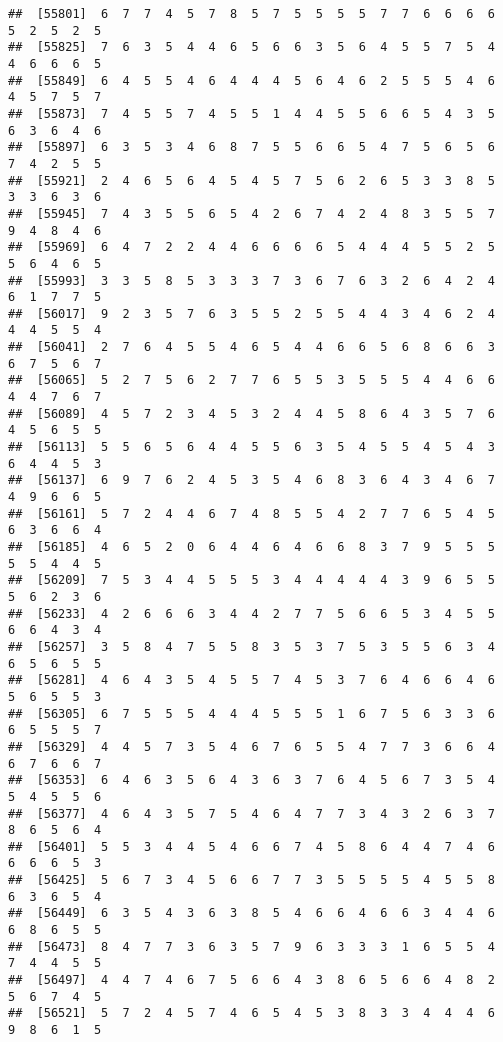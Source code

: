 \documentclass[
]{book}
\begin{document}
\begin{verbatim}
##  [55801]  6  7  7  4  5  7  8  5  7  5  5  5  5  7  7  6  6  6  6  5  2  5  2  5
##  [55825]  7  6  3  5  4  4  6  5  6  6  3  5  6  4  5  5  7  5  4  4  6  6  6  5
##  [55849]  6  4  5  5  4  6  4  4  4  5  6  4  6  2  5  5  5  4  6  4  5  7  5  7
##  [55873]  7  4  5  5  7  4  5  5  1  4  4  5  5  6  6  5  4  3  5  6  3  6  4  6
##  [55897]  6  3  5  3  4  6  8  7  5  5  6  6  5  4  7  5  6  5  6  7  4  2  5  5
##  [55921]  2  4  6  5  6  4  5  4  5  7  5  6  2  6  5  3  3  8  5  3  3  6  3  6
##  [55945]  7  4  3  5  5  6  5  4  2  6  7  4  2  4  8  3  5  5  7  9  4  8  4  6
##  [55969]  6  4  7  2  2  4  4  6  6  6  6  5  4  4  4  5  5  2  5  5  6  4  6  5
##  [55993]  3  3  5  8  5  3  3  3  7  3  6  7  6  3  2  6  4  2  4  6  1  7  7  5
##  [56017]  9  2  3  5  7  6  3  5  5  2  5  5  4  4  3  4  6  2  4  4  4  5  5  4
##  [56041]  2  7  6  4  5  5  4  6  5  4  4  6  6  5  6  8  6  6  3  6  7  5  6  7
##  [56065]  5  2  7  5  6  2  7  7  6  5  5  3  5  5  5  4  4  6  6  4  4  7  6  7
##  [56089]  4  5  7  2  3  4  5  3  2  4  4  5  8  6  4  3  5  7  6  4  5  6  5  5
##  [56113]  5  5  6  5  6  4  4  5  5  6  3  5  4  5  5  4  5  4  3  6  4  4  5  3
##  [56137]  6  9  7  6  2  4  5  3  5  4  6  8  3  6  4  3  4  6  7  4  9  6  6  5
##  [56161]  5  7  2  4  4  6  7  4  8  5  5  4  2  7  7  6  5  4  5  6  3  6  6  4
##  [56185]  4  6  5  2  0  6  4  4  6  4  6  6  8  3  7  9  5  5  5  5  5  4  4  5
##  [56209]  7  5  3  4  4  5  5  5  3  4  4  4  4  4  3  9  6  5  5  5  6  2  3  6
##  [56233]  4  2  6  6  6  3  4  4  2  7  7  5  6  6  5  3  4  5  5  6  6  4  3  4
##  [56257]  3  5  8  4  7  5  5  8  3  5  3  7  5  3  5  5  6  3  4  6  5  6  5  5
##  [56281]  4  6  4  3  5  4  5  5  7  4  5  3  7  6  4  6  6  4  6  5  6  5  5  3
##  [56305]  6  7  5  5  5  4  4  4  5  5  5  1  6  7  5  6  3  3  6  6  5  5  5  7
##  [56329]  4  4  5  7  3  5  4  6  7  6  5  5  4  7  7  3  6  6  4  6  7  6  6  7
##  [56353]  6  4  6  3  5  6  4  3  6  3  7  6  4  5  6  7  3  5  4  5  4  5  5  6
##  [56377]  4  6  4  3  5  7  5  4  6  4  7  7  3  4  3  2  6  3  7  8  6  5  6  4
##  [56401]  5  5  3  4  4  5  4  6  6  7  4  5  8  6  4  4  7  4  6  6  6  6  5  3
##  [56425]  5  6  7  3  4  5  6  6  7  7  3  5  5  5  5  4  5  5  8  6  3  6  5  4
##  [56449]  6  3  5  4  3  6  3  8  5  4  6  6  4  6  6  3  4  4  6  6  8  6  5  5
##  [56473]  8  4  7  7  3  6  3  5  7  9  6  3  3  3  1  6  5  5  4  7  4  4  5  5
##  [56497]  4  4  7  4  6  7  5  6  6  4  3  8  6  5  6  6  4  8  2  5  6  7  4  5
##  [56521]  5  7  2  4  5  7  4  6  5  4  5  3  8  3  3  4  4  4  6  9  8  6  1  5

\end{verbatim}
\end{document}
